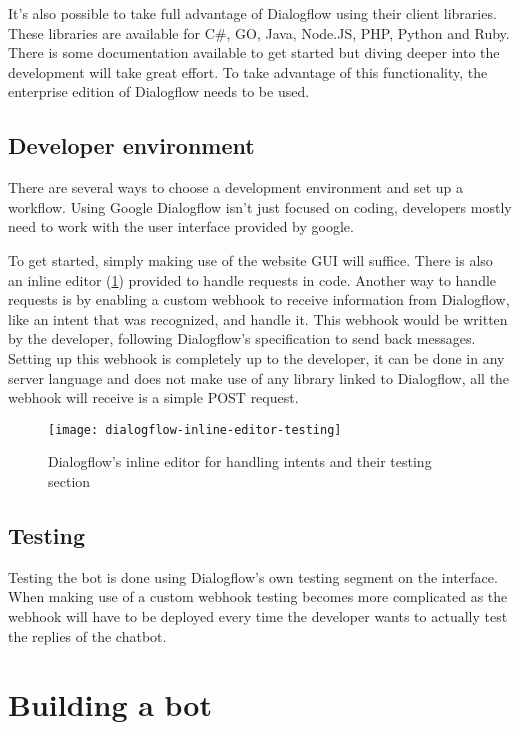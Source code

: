It's also possible to take full advantage of Dialogflow using their client libraries. These libraries are available for C\#, GO, Java, Node.JS, PHP, Python and Ruby. There is some documentation available to get started but diving deeper into the development will take great effort. To take advantage of this functionality, the enterprise edition of Dialogflow needs to be used.

\subsection{Developer environment}

There are several ways to choose a development environment and set up a workflow. Using Google Dialogflow isn't just focused on coding, developers mostly need to work with the user interface provided by google.

To get started, simply making use of the website GUI will suffice. There is also an inline editor (\ref{fig:dialogflow-inline-editor-testing}) provided to handle requests in code. Another way to handle requests is by enabling a custom webhook to receive information from Dialogflow, like an intent that was recognized, and handle it. This webhook would be written by the developer, following Dialogflow's specification to send back messages. Setting up this webhook is completely up to the developer, it can be done in any server language and does not make use of any library linked to Dialogflow, all the webhook will receive is a simple POST request.

\begin{figure}[ht]
	\centering
	\texttt{[image: dialogflow-inline-editor-testing]}\label{fig:dialogflow-inline-editor-testing}
	\caption{Dialogflow's inline editor for handling intents and their testing section}
\end{figure}


\subsection{Testing}

Testing the bot is done using Dialogflow's own testing segment on the interface. When making use of a custom webhook testing becomes more complicated as the webhook will have to be deployed every time the developer wants to actually test the replies of the chatbot.

\clearpage
\newpage

\section{Building a bot}

